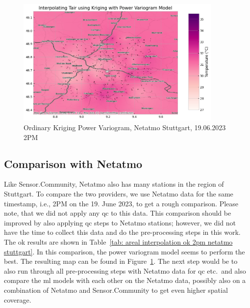 \begin{figure}[ht]
    \centering
    \includegraphics[width=0.9\textwidth]{images/eval areal interpolation ok stuttgart 14h netatmo.png}
    \caption{Ordinary Kriging Power Variogram, Netatmo Stuttgart, 19.06.2023 2PM}
    \label{fig:eval areal interpolation ok 14h stuttgart netatmo}
\end{figure}

\subsection{Comparison with Netatmo}

Like Sensor.Community, Netatmo also has many stations in the region of Stuttgart. To compare the two providers, we use Netatmo data for the same timestamp, i.e., 2PM on the 19. June 2023, to get a rough comparison. Please note, that we did not apply any \gls{qc} to this data. This comparison should be improved by also applying \gls{qc} steps to Netatmo stations; however, we did not have the time to collect this data and do the pre-processing steps in this work. The \gls{ok} results are shown in Table~\ref{tab: areal interpolation ok 2pm netatmo stuttgart}. In this comparison, the power variogram model seems to perform the best. The resulting map can be found in Figure~\ref{fig:eval areal interpolation ok 14h stuttgart netatmo}. The next step would be to also run through all pre-processing steps with Netatmo data for \gls{qc} etc.\ and also compare the \gls{ml} models with each other on the Netatmo data, possibly also on a combination of Netatmo and Sensor.Community to get even higher spatial coverage.

